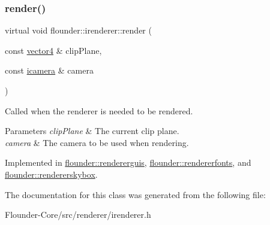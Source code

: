 \subsubsection{\texorpdfstring{render()}{render()}}
{\footnotesize\ttfamily virtual void flounder\+::irenderer\+::render (\begin{DoxyParamCaption}\item[{const \hyperlink{classflounder_1_1vector4}{vector4} \&}]{clip\+Plane,  }\item[{const \hyperlink{classflounder_1_1icamera}{icamera} \&}]{camera }\end{DoxyParamCaption})\hspace{0.3cm}{\ttfamily [pure virtual]}}



Called when the renderer is needed to be rendered. 


\begin{DoxyParams}{Parameters}
{\em clip\+Plane} & The current clip plane. \\
\hline
{\em camera} & The camera to be used when rendering. \\
\hline
\end{DoxyParams}


Implemented in \hyperlink{classflounder_1_1rendererguis_afdf543d9a5dfbe3c7fdd9d266dd34981}{flounder\+::rendererguis}, \hyperlink{classflounder_1_1rendererfonts_a7702e992c6546d06019ce2ef1bf68c33}{flounder\+::rendererfonts}, and \hyperlink{classflounder_1_1rendererskybox_a66714b2e580cd64a30e92d78a0260a33}{flounder\+::rendererskybox}.



The documentation for this class was generated from the following file\+:\begin{DoxyCompactItemize}
\item 
Flounder-\/\+Core/src/renderer/irenderer.\+h\end{DoxyCompactItemize}
